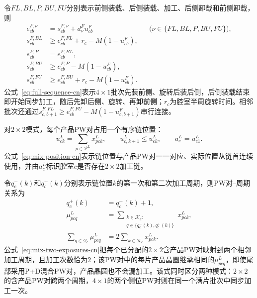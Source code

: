 \documentclass[final,5p,times,twocolumn]{elsarticle}
\begin{document}
令$FL,BL,P,BU,FU$分别表示前侧装载、后侧装载、加工、后侧卸载和前侧卸载，则
\begin{equation}
\begin{aligned}
e^{F,\nu}_{cb}&=s^{F,\nu}_{cb}+d^{F}_{\nu}u^F_{cb}
&&\bigl(\nu\in\{FL,BL,P,BU,FU\}\bigr),\\
s^{F,BL}_{cb}&\ge e^{F,FL}_{cb}+r_c-M(1-u^F_{cb}),\\
s^{F,P}_{cb}&=e^{F,BL}_{cb},\\
s^{F,BU}_{cb}&\ge e^{F,P}_{cb}-M(1-u^F_{cb}),\\
s^{F,FU}_{cb}&\ge e^{F,BU}_{cb}+r_c-M(1-u^F_{cb}).
\end{aligned}
\label{eq:full-sequence-cn}
\end{equation}
公式~\eqref{eq:full-sequence-cn}表示$4\times1$批次先装前侧、旋转后装后侧，后侧装载结束即开始同步加工，随后先卸后侧、旋转、再卸前侧；$r_c$为腔室半周旋转时间。相邻批次还通过$s^{F,FL}_{c,b+1}\ge e^{F,FU}_{cb}-M(1-u^F_{c,b+1})$串行连接。

对$2\times2$模式，每个产品PW对占用一个有序链位置：
\begin{equation}
u^L_{ck}=\sum_{p\in\mathcal P^L}x^L_{pck},\qquad
u^L_{c,k+1}\le u^L_{ck},\qquad
a^L_c=u^L_{c1}.
\label{eq:mix-position-cn}
\end{equation}
公式~\eqref{eq:mix-position-cn}表示链位置与产品PW对一一对应、实际位置从链首连续使用，并由$a^L_c$标识腔室$c$是否存在$2\times2$加工链。

令$q_c^-(k)$和$q_c^+(k)$分别表示链位置$k$的第一次和第二次加工周期，则PW对--周期关系为
\begin{equation}
\begin{aligned}
q_c^+(k)&=q_c^-(k)+1,\\
\mu^L_{pcq}
&=\sum_{\substack{k\in\mathcal K_c:\\q\in\{q_c^-(k),q_c^+(k)\}}}x^L_{pck},\\
\sum_{q\in\mathcal Q_c}\mu^L_{pcq}
&=2\sum_{k\in\mathcal K_c}x^L_{pck}.
\end{aligned}
\label{eq:mix-two-exposures-cn}
\end{equation}
公式~\eqref{eq:mix-two-exposures-cn}把每个已分配的$2\times2$含产品PW对映射到两个相邻加工周期，且加工次数恰为2；该PW对中的每片产品晶圆继承相同的$\mu^L_{pcq}$，即使尾部采用P+D混合PW对，产品晶圆也不会漏加工。该式同时区分两种模式：$2\times2$的含产品PW对跨两个周期，$4\times1$的两个侧位PW对则在同一个满片批次中同步加工一次。
\end{document}
